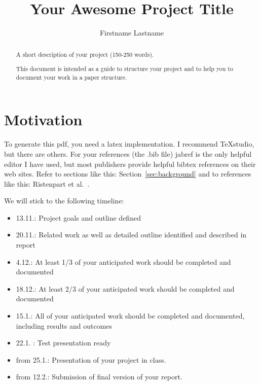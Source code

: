 \documentclass{llncs}
\title{Your Awesome Project Title}
\author{Firstname Lastname\inst{1}}
\institute{	University of L\"ubeck, Germany\\
	\email{firstname.lastname@student.uni-luebeck.de}}
\begin{document}
\maketitle


\begin{abstract}
A short description of your project (150-250 words).

This document is intended as a guide to structure your project and to help you to document your work in a paper structure.

\end{abstract}



\section{Motivation}

To generate this pdf, you need a latex implementation. I recommend TeXstudio, but there are others. For your references (the .bib file) jabref is the only helpful editor I have used, but most publishers provide helpful bibtex references on their web sites.
Refer to sections like this: Section~\ref{sec:background} and to references like this: Ristenpart et al.~\cite{Ristenpart_hey}. 


We will stick to the following timeline:

\begin{itemize}
	\item 13.11.: Project goals and outline defined
	\item 20.11.: Related work as well as detailed outline identified and described in report
	\item 4.12.: At least 1/3 of your anticipated work should be completed and documented
	\item 18.12.: At least 2/3 of your anticipated work should be completed and documented
	\item 15.1.: All of your anticipated work should be completed and documented, including results and outcomes
	\item 22.1. : Test presentation ready 
	\item from 25.1.: Presentation of your project in class.
	\item from 12.2.: Submission of final version of your report.
\end{itemize}
\end{document}
